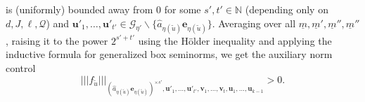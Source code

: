\documentclass[11pt]{amsart}
\theoremstyle{definition}
\DeclareMathOperator*{\E}{\mathbb{E}}
\newcommand{\N}{{\mathbb N}}
\newcommand{\CG}{{\mathcal G}}
\newcommand{\CQ}{{\mathcal Q}}
\newcommand{\be}{{\mathbf{e}}}
\newcommand{\bu}{{\mathbf{u}}}
\newcommand{\bv}{{\mathbf{v}}}
\newcommand{\uh}{{\underline{h}}}
\newcommand{\um}{{\underline{m}}}
\newcommand{\nnorm}[1]{\lvert\!|\!| #1|\!|\!\rvert}
\newcommand{\1}{{\mathbf{1}}}
\begin{document}
           is (uniformly) bounded away from 0
         for some $s',t'\in\N$ (depending only on $d,J,\ell,\CQ$) and $\bu'_{1},\dots,\bu'_{t'}\in \CG_{\eta'}\backslash\{\hat{a}_{\eta(\tilde{u})}\be_{\eta(\tilde{u})}\}$.
   Averaging over all $\um,\um',\um'',\um''$, raising it to the power $2^{s'+t'}$ using the H{\"o}lder inequality and applying the inductive formula for generalized box seminorms, we get the auxiliary norm control
      $$\nnorm{f_{\tilde{u}}}_{(\hat{a}_{\eta(\tilde{u})}\be_{\eta(\tilde{u})})^{\times s'}, \bu'_{1},\dots,\bu'_{t'},\bv_{1},\dots,\bv_{t},\bu_{1},\dots,\bu_{k-1}}>0.$$
     

      
      
\end{document}
